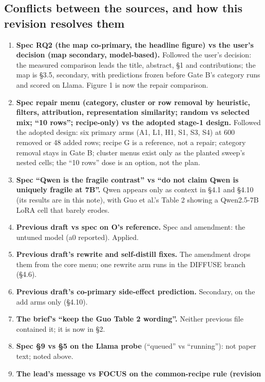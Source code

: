 \documentclass{article}
\theoremstyle{plain}
\theoremstyle{definition}
\theoremstyle{remark}
\begin{document}
\subsection{Conflicts between the sources, and how this revision resolves them}

\begin{enumerate}
  \item \textbf{Spec RQ2 (the map co-primary, the headline figure) vs the user's
        decision (map secondary, model-based).} Followed the user's decision:
        the measured comparison leads the title, abstract, \S{}1 and
        contributions; the map is \S{}3.5, secondary, with predictions frozen
        before Gate B's category runs and scored on Llama. Figure 1 is now the
        repair comparison.
  \item \textbf{Spec repair menu (category, cluster or row removal by heuristic,
        filters, attribution, representation similarity; random vs selected mix;
        ``10 rows''; recipe-only) vs the adopted stage-1 design.} Followed the
        adopted design: six primary arms (A1, L1, H1, S1, S3, S4) at 600 removed
        or 48 added rows; recipe G is a reference, not a repair; category
        removal stays in Gate B; cluster menus exist only as the planted sweep's
        nested cells; the ``10 rows'' dose is an option, not the plan.
  \item \textbf{Spec ``Qwen is the fragile contrast'' vs ``do not claim Qwen is
        uniquely fragile at 7B''.} Qwen appears only as context in \S{}4.1 and
        \S{}4.10 (its results are in this note), with Guo et al.'s Table 2
        showing a Qwen2.5-7B LoRA cell that barely erodes.
  \item \textbf{Previous draft vs spec on O's reference.} Spec and amendment:
        the untuned model (a0 reported). Applied.
  \item \textbf{Previous draft's rewrite and self-distill fixes.} The amendment
        drops them from the core menu; one rewrite arm runs in the DIFFUSE
        branch (\S{}4.6).
  \item \textbf{Previous draft's co-primary side-effect prediction.} Secondary,
        on the add arms only (\S{}4.10).
  \item \textbf{The brief's ``keep the Guo Table 2 wording''.} Neither previous
        file contained it; it is now in \S{}2.
  \item \textbf{Spec \S{}9 vs \S{}5 on the Llama probe} (``queued'' vs
        ``running''): not paper text; noted above.
  \item \textbf{The lead's message vs FOCUS on the common-recipe rule (revision
}
\end{enumerate}
\end{document}

